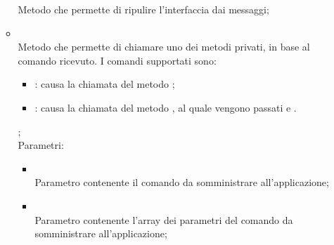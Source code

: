 \begin{itemize}
\begin{itemize}
		Metodo che permette di ripulire l'interfaccia dai messaggi;\\
		\item[]  \\
		Metodo che permette di chiamare uno dei metodi privati, in base al comando ricevuto.
I comandi supportati sono:
\begin{itemize}
   \item {}: causa la chiamata del metodo ;
   \item {}: causa la chiamata del metodo , al quale vengono passati  e .
\end{itemize}
;\\
		Parametri:
		\begin{itemize}
			\item {} \\
			Parametro contenente il comando da somministrare all'applicazione;
			\item {} \\
			Parametro contenente l'array dei parametri del comando da somministrare all'applicazione;
		\end{itemize}
	\end{itemize}
\end{itemize}

